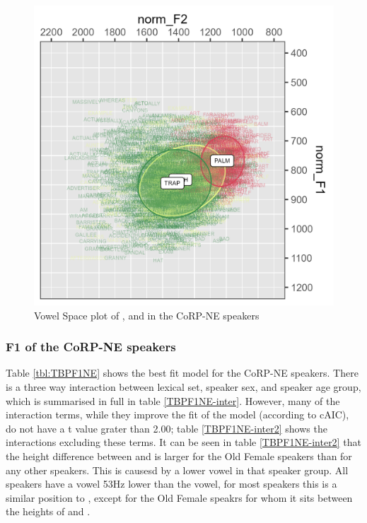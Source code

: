 \documentclass[../../../00.FullDoc/tex/APRReport-year4]{subfiles}
\begin{document}
\begin{figure}[h]
	\includegraphics[width=\textwidth]{../figures/TBP-NE-vplot.png}
	\caption{Vowel Space plot of \trap{},\bath{} and \palm{} in the CoRP-NE speakers} \label{fig:TBPvplotNE}
\end{figure}



\subsubsection{F1 of the CoRP-NE speakers}
Table \ref{tbl:TBPF1NE} shows the best fit model for the CoRP-NE speakers. There is a three way interaction between lexical set, speaker sex, and speaker age group, which is summarised in full in table \ref{TBPF1NE-inter}. However, many of the interaction terms, while they improve the fit of the model (according to cAIC), do not have a t value grater than 2.00; table \ref{TBPF1NE-inter2} shows the interactions excluding these terms. It can be seen in table \ref{TBPF1NE-inter2} that the height difference between \trap{} and \palm{} is larger for the Old Female speakers than for any other speakers. This is causesd by a lower \trap{} vowel in that speaker group. All speakers have a \bath{} vowel 53Hz lower than the \palm{} vowel, for most speakers this is a similar position to \trap{}, except for the Old Female speakrs for whom it sits between the heights of \trap{} and \palm{}.
\end{document}
